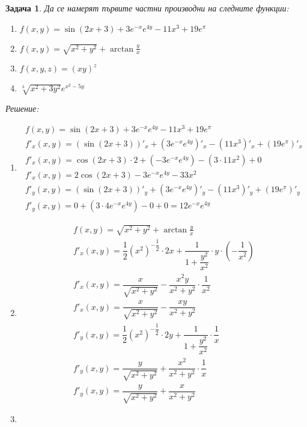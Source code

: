 \documentclass[a4paper,fleqn,12pt]{article}
\newtheorem{task}{Задача}[section]
\begin{document}
\begin{task}
Да се намерят първите частни производни на следните функции:
\begin{enumerate}
\item $f(x,y) = \sin{(2x+3)} + 3e^{-x}e^{4y} - 11x^3 + 19e^\pi$
\item $f(x,y) = \sqrt{x^2 + y^2} + \arctan {\frac{y}{x}}$
\item $f(x,y,z) = (xy)^z$
\item $\sqrt[3]{x^2+3y^2} e^{x^2 - 5y}$
\end{enumerate}
Решение: \\

\begin{enumerate}
\item 
\begin{gather*}
f(x,y) = \sin{(2x+3)} + 3e^{-x}e^{4y} - 11x^3 + 19e^\pi \\
f'_x(x,y) = (\sin{(2x+3)})'_x + (3e^{-x}e^{4y})'_x - (11x^3)'_x + (19e^\pi )'_x \\
f'_x(x,y) = \cos{(2x+3)}\cdot 2 + (-3e^{-x}e^{4y}) - (3 \cdot 11x^2) + 0 \\
f'_x(x,y) = 2\cos{(2x+3)} -3e^{-x}e^{4y} - 33x^2 \\
f'_y(x,y) = (\sin{(2x+3)})'_y + (3e^{-x}e^{4y})'_y - (11x^3)'_y + (19e^\pi )'_y \\
f'_y(x,y) = 0 + (3 \cdot 4 e^{-x}e^{4y}) - 0 + 0 = 12e^{-x}e^{4y}
\end{gather*}
\item 
\begin{gather*}
f(x,y) = \sqrt{x^2 + y^2} + \arctan {\frac{y}{x}}\\
f'_x(x,y) = \dfrac{1}{2} (x^2)^{- \dfrac{1}{2}} \cdot 2x + \dfrac{1}{1 + \dfrac{y^2}{x^2}} \cdot y \cdot ( - \dfrac{1}{x^2}) \\
f'_x(x,y) = \dfrac{x}{\sqrt{x^2 + y^2}} - \dfrac{x^2y}{x^2 + y^2} \cdot \dfrac{1}{x^2} \\
f'_x(x,y) = \dfrac{x}{\sqrt{x^2 + y^2}} - \dfrac{xy}{x^2 + y^2} \\
f'_y(x,y) = \dfrac{1}{2} (x^2)^{- \dfrac{1}{2}} \cdot 2y + \dfrac{1}{1 + \dfrac{y^2}{x^2}} \cdot  \dfrac{1}{x} \\
f'_y(x,y) = \dfrac{y}{\sqrt{x^2 + y^2}} + \dfrac{x^2}{x^2 + y^2} \cdot \dfrac{1}{x}\\
f'_y(x,y) = \dfrac{y}{\sqrt{x^2 + y^2}} + \dfrac{x}{x^2 + y^2}
\end{gather*}
\item 
\begin{gather*}

\end{gather*}
\end{enumerate}
\end{task}
\end{document}
